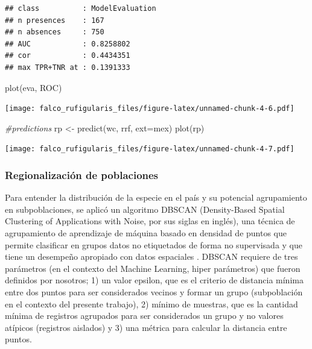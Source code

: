 \documentclass[
]{article}
\newenvironment{Shaded}{\begin{snugshade}}{\end{snugshade}}
\newcommand{\AttributeTok}[1]{\textcolor[rgb]{0.77,0.63,0.00}{#1}}
\newcommand{\CommentTok}[1]{\textcolor[rgb]{0.56,0.35,0.01}{\textit{#1}}}
\newcommand{\FunctionTok}[1]{\textcolor[rgb]{0.00,0.00,0.00}{#1}}
\newcommand{\NormalTok}[1]{#1}
\newcommand{\OtherTok}[1]{\textcolor[rgb]{0.56,0.35,0.01}{#1}}
\newcommand{\StringTok}[1]{\textcolor[rgb]{0.31,0.60,0.02}{#1}}
\begin{document}
\begin{verbatim}
## class          : ModelEvaluation 
## n presences    : 167 
## n absences     : 750 
## AUC            : 0.8258802 
## cor            : 0.4434351 
## max TPR+TNR at : 0.1391333
\end{verbatim}

\begin{Shaded}
\begin{Highlighting}[]
\FunctionTok{plot}\NormalTok{(eva, }\StringTok{\textquotesingle{}ROC\textquotesingle{}}\NormalTok{)}
\end{Highlighting}
\end{Shaded}

\texttt{[image: falco\_rufigularis\_files/figure-latex/unnamed-chunk-4-6.pdf]}

\begin{Shaded}
\begin{Highlighting}[]
\CommentTok{\#predictions}
\NormalTok{rp }\OtherTok{\textless{}{-}} \FunctionTok{predict}\NormalTok{(wc, rrf, }\AttributeTok{ext=}\NormalTok{mex)}
\FunctionTok{plot}\NormalTok{(rp)}
\end{Highlighting}
\end{Shaded}

\texttt{[image: falco\_rufigularis\_files/figure-latex/unnamed-chunk-4-7.pdf]}

\hypertarget{regionalizaciuxf3n-de-poblaciones}{%
\subsubsection{Regionalización de
poblaciones}\label{regionalizaciuxf3n-de-poblaciones}}

Para entender la distribución de la especie en el país y su potencial
agrupamiento en subpoblaciones, se aplicó un algoritmo DBSCAN
(Density-Based Spatial Clustering of Applications with Noise, por sus
siglas en inglés), una técnica de agrupamiento de aprendizaje de máquina
basado en densidad de puntos que permite clasificar en grupos datos no
etiquetados de forma no supervisada y que tiene un desempeño apropiado
con datos espaciales . DBSCAN requiere de tres parámetros (en el
contexto del Machine Learning, hiper parámetros) que fueron definidos
por nosotros; 1) un valor epsilon, que es el criterio de distancia
mínima entre dos puntos para ser considerados vecinos y formar un grupo
(subpoblación en el contexto del presente trabajo), 2) mínimo de
muestras, que es la cantidad mínima de registros agrupados para ser
considerados un grupo y no valores atípicos (registros aislados) y 3)
una métrica para calcular la distancia entre puntos.
\end{document}
